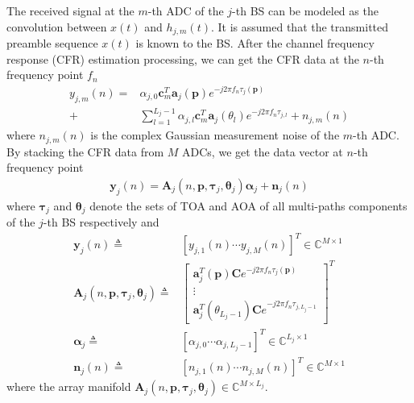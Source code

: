 \documentclass[journal]{IEEEtran}
\begin{document}
The received signal at the $m$-th ADC of the $j$-th BS can be modeled as the convolution between $x(t)$ and $h_{j,m}(t)$. It is assumed that the transmitted preamble sequence $x(t)$ is known to the BS.
After the channel frequency response (CFR) estimation processing, we can get the CFR data at the $n$-th frequency point $f_n$
\begin{align}\label{CFR}
  y_{j,m}(n)=&\alpha_{j,0}\boldsymbol{c}_m^T\boldsymbol{a}_j(\boldsymbol{p})e^{-j2\pi f_n \tau_j(\boldsymbol{p})}\\\nonumber
  +&\sum_{l=1}^{L_j-1}\alpha_{j,l}\boldsymbol{c}_m^T\boldsymbol{a}_j(\theta_l)e^{-j2\pi f_n \tau_{j,l}}+n_{j,m}(n)
\end{align} 
where $n_{j,m}(n)$ is the complex Gaussian measurement noise of the $m$-th ADC.
By stacking the CFR data from $M$ ADCs, we get the data vector at $n$-th frequency point
\begin{align}\label{CFR_M0}
  \boldsymbol{y}_j(n)=\boldsymbol{A}_j(n,\boldsymbol{p},\boldsymbol{\tau}_j,\boldsymbol{\theta}_j)\boldsymbol{\alpha}_j+\boldsymbol{n}_j(n)
\end{align} 
where $\boldsymbol{\tau}_j$ and $\boldsymbol{\theta}_j$ denote the sets of TOA and AOA of all multi-paths components of the $j$-th BS respectively and
\begin{align}\label{CFR_M1}
  \boldsymbol{y}_j(n)\triangleq& [y_{j,1}(n)\cdots y_{j,M}(n)]^T \in \mathbb{C}^{M \times 1}\\ \nonumber
  \boldsymbol{A}_j(n,\boldsymbol{p},\boldsymbol{\tau}_j,\boldsymbol{\theta}_j)\triangleq&\left[
  \begin{array}{c}
    \boldsymbol{a}_j^T(\boldsymbol{p})\boldsymbol{C}e^{-j2\pi f_n \tau_j(\boldsymbol{p})}\\
     \vdots \\
     \boldsymbol{a}_j^T(\theta_{L_j-1})\boldsymbol{C}e^{-j2\pi f_n \tau_{j,L_j-1}}
  \end{array}\right]^T\\ \nonumber
  \boldsymbol{\alpha}_j\triangleq& [\alpha_{j,0}\cdots \alpha_{j,L_j-1}]^T\in \mathbb{C}^{L_j\times 1}\\ \nonumber
  \boldsymbol{n}_j(n)\triangleq& [n_{j,1}(n)\cdots n_{j,M}(n)]^T\in \mathbb{C}^{M \times 1}
\end{align}
where the array manifold $\boldsymbol{A}_j(n,\boldsymbol{p},\boldsymbol{\tau}_j,\boldsymbol{\theta}_j)\in \mathbb{C}^{M\times L_j}$.
\end{document}
